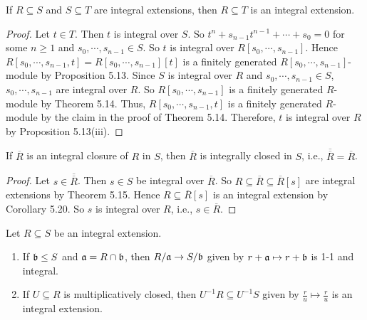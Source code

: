 \begin{corollary}
    If $R \subseteq S$ and $S \subseteq T$ are integral extensions, then $R \subseteq T$ is an integral extension.
\end{corollary}

\begin{proof}
    Let $t \in T$. Then $t$ is integral over $S$. So $t^n + s_{n-1} t^{n-1} + \cdots + s_0 = 0$ for some $n \geq 1$ and $s_0,\cdots,s_{n-1} \in S$. So $t$ is integral over $R[s_0,\cdots,s_{n-1}]$. Hence $R[s_0,\cdots,s_{n-1},t] = R[s_0,\cdots,s_{n-1}][t]$ is a finitely generated $R[s_0,\cdots,s_{n-1}]$-module by Proposition 5.13. Since $S$ is integral over $R$ and $s_0,\cdots,s_{n-1} \in S$, $s_0,\cdots,s_{n-1}$ are integral over $R$. So $R[s_0,\cdots,s_{n-1}]$ is a finitely generated $R$-module by Theorem 5.14. Thus, $R[s_0,\cdots,s_{n-1},t]$ is a finitely generated $R$-module by the claim in the proof of Theorem 5.14. Therefore, $t$ is integral over $R$ by Proposition 5.13(iii).
\end{proof}

\begin{corollary}
    If $\overbar{R}$ is an integral closure of $R$ in $S$, then $\overbar{R}$ is integrally closed in $S$, i.e., ${\overbar{\overbar{R}}} = \overbar{R}$.
\end{corollary}

\begin{proof}
    Let $s \in \overbar{\overbar{R}}$. Then $s \in S$ be integral over $\overbar{R}$. So $R \subseteq \overbar{R} \subseteq \overbar{R}[s]$ are integral extensions by Theorem 5.15. Hence $R \subseteq \overbar{R}[s]$ is an integral extension by Corollary 5.20. So $s$ is integral over $R$, i.e., $s \in \overbar{R}$.
\end{proof}

\begin{proposition}
    Let $R \subseteq S$ be an integral extension.
    \begin{enumerate}
        \item If $\mathfrak{b} \leq S$ and $\mathfrak{a} = R \cap \mathfrak{b}$, then $R/\mathfrak{a} \to S/\mathfrak{b}$ given by $r+\mathfrak{a} \mapsto r+\mathfrak{b}$ is 1-1 and integral. 
        \item If $U \subseteq R$ is multiplicatively closed, then $U^{-1}R \subseteq U^{-1}S$ given by $\frac{r}{u} \mapsto \frac{r}{u}$ is an integral extension.
    \end{enumerate}
\end{proposition}

